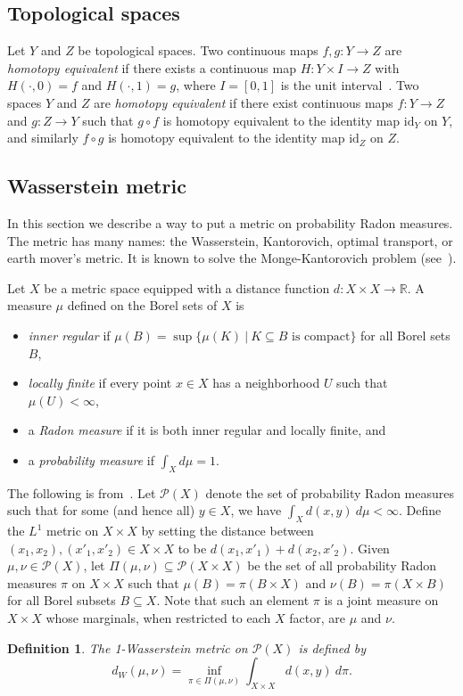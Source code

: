 \documentclass{amsart}
\theoremstyle{plain}
\newtheorem{definition}[lemma]{Definition}
\theoremstyle{definition}
\theoremstyle{myremark}
\newcommand{\R}{\mathbb{R}}
\newcommand{\cP}{\mathcal{P}}
\newcommand{\id}{\mathrm{id}}
\begin{document}
\subsection{Topological spaces}\label{ssec:Topological}

Let $Y$ and $Z$ be topological spaces.
Two continuous maps $f,g\colon Y\to Z$ are \emph{homotopy equivalent} if there exists a continuous map $H\colon Y\times I\to Z$ with $H(\cdot,0)=f$ and $H(\cdot,1)=g$, where $I=[0,1]$ is the unit interval~\cite{hatcher2002algebraic}.
Two spaces $Y$ and $Z$ are \emph{homotopy equivalent} if there exist continuous maps $f\colon Y\to Z$ and $g\colon Z\to Y$ such that $g\circ f$ is homotopy equivalent to the identity map $\id_Y$ on $Y$, and similarly $f\circ g$ is homotopy equivalent to the identity map $\id_Z$ on $Z$.


\subsection{Wasserstein metric}\label{ssec:Wasserstein}

In this section we describe a way to put a metric on probability Radon measures. The metric has many names: the Wasserstein, Kantorovich, optimal transport, or earth mover's metric. It is known to solve the Monge-Kantorovich problem (see~\cite{vershik2013long}).

Let $X$ be a metric space equipped with a distance function $d\colon X\times X\to\R$. A measure $\mu$ defined on the Borel sets of $X$ is 
\begin{itemize}
\item \emph{inner regular} if $\mu(B)=\sup\{\mu(K)~|~K\subseteq B\mbox{ is compact}\}$ for all Borel sets~$B$,
\item \emph{locally finite} if every point $x\in X$ has a neighborhood $U$ such that $\mu(U)<\infty$,
\item a \emph{Radon measure} if it is both inner regular and locally finite, and
\item a \emph{probability measure} if $\int_Xd\mu = 1$.
\end{itemize}

The following is from~\cite{edwards2011kantorovich,kellerer1982duality}. Let $\cP(X)$ denote the set of probability Radon measures such that for some (and hence all) $y\in X$, we have $\int_X d(x,y)\ d\mu<\infty$.
Define the $L^1$ metric on $X\times X$ by setting the distance between $(x_1,x_2),(x'_1,x'_2)\in X\times X$ to be $d(x_1,x'_1)+d(x_2,x'_2)$.
Given $\mu,\nu\in\cP(X)$, let $\Pi(\mu,\nu)\subseteq\cP(X\times X)$ be the set of all probability Radon measures $\pi$ on $X\times X$ such that $\mu(B)=\pi(B\times X)$ and $\nu(B)=\pi(X\times B)$ for all Borel subsets $B\subseteq X$.
Note that such an element $\pi$ is a joint measure on $X\times X$ whose marginals, when restricted to each $X$ factor, are $\mu$ and $\nu$.
\begin{definition}\label{def:Wasserstein}
The 1-Wasserstein metric on $\cP(X)$ is defined by
\[ d_W(\mu,\nu)=\inf_{\pi\in\Pi(\mu,\nu)}\int_{X\times X}d(x,y)\ d\pi. \]
\end{definition}
\end{document}
